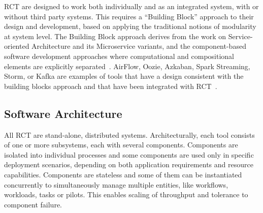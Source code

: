 \documentclass[preprint,12pt, a4paper]{elsarticle}
\begin{document}
RCT are designed to work both individually and as an integrated system, with
or without third party systems. This requires a ``Building Block'' approach
to their design and development, based on applying the traditional notions of
modularity at system level. The Building Block approach derives from the work
on Service-oriented Architecture and its Microservice variants, and the
component-based software development approaches where computational and
compositional elements are explicitly
separated~\cite{batory1992design,garlan1995architectural,lenz1988software,clemens1998component,schneider2000components}.
AirFlow, Oozie, Azkaban, Spark Streaming, Storm, or Kafka are examples of
tools that have a design consistent with the building blocks approach and
that have been integrated with RCT~\cite{turilli2019middleware}.


\subsection{Software Architecture}\label{ssec:architecture}


All RCT are stand-alone, distributed systems. Architecturally, each tool
consists of one or more subsystems, each with several components. Components
are isolated into individual processes and some components are used only in
specific deployment scenarios, depending on both application requirements and
resource capabilities. Components are stateless and some of them can be
instantiated concurrently to simultaneously manage multiple entities, like
workflows, workloads, tasks or pilots. This enables scaling of throughput and
tolerance to component failure.
\end{document}
